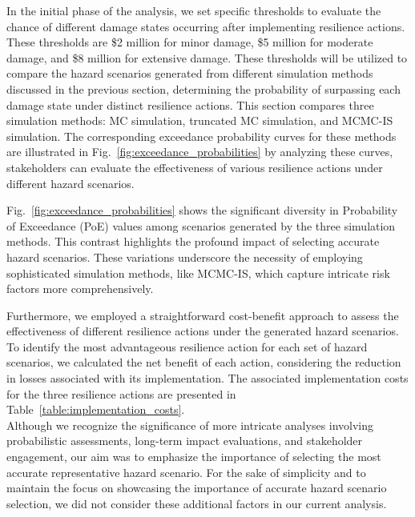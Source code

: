     In the initial phase of the analysis, we set specific thresholds to evaluate the chance of different damage states occurring after implementing resilience actions. These thresholds are \$2 million for minor damage, \$5 million for moderate damage, and \$8 million for extensive damage. These thresholds will be utilized to compare the hazard scenarios generated from different simulation methods discussed in the previous section, determining the probability of surpassing each damage state under distinct resilience actions. This section compares three simulation methods: MC simulation, truncated MC simulation, and MCMC-IS simulation. The corresponding exceedance probability curves for these methods are illustrated in Fig.~\ref{fig:exceedance_probabilities} by analyzing these curves, stakeholders can evaluate the effectiveness of various resilience actions under different hazard scenarios.
    
    

    Fig.~\ref{fig:exceedance_probabilities} shows the significant diversity in Probability of Exceedance (PoE) values among scenarios generated by the three simulation methods. This contrast highlights the profound impact of selecting accurate hazard scenarios. These variations underscore the necessity of employing sophisticated simulation methods, like MCMC-IS, which capture intricate risk factors more comprehensively.

    Furthermore, we employed a straightforward cost-benefit approach to assess the effectiveness of different resilience actions under the generated hazard scenarios. To identify the most advantageous resilience action for each set of hazard scenarios, we calculated the net benefit of each action, considering the reduction in losses associated with its implementation. The associated implementation costs for the three resilience actions are presented in Table~\ref{table:implementation_costs}. \\
        
    
    
    Although we recognize the significance of more intricate analyses involving probabilistic assessments, long-term impact evaluations, and stakeholder engagement, our aim was to emphasize the importance of selecting the most accurate representative hazard scenario. For the sake of simplicity and to maintain the focus on showcasing the importance of accurate hazard scenario selection, we did not consider these additional factors in our current analysis.

